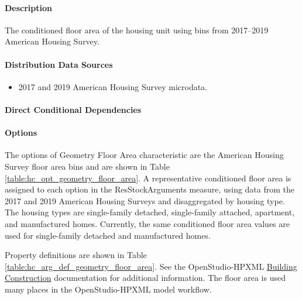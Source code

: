 \paragraph{Description}
% 
The conditioned floor area of the housing unit using bins from 2017--2019 American Housing Survey.

\paragraph{Distribution Data Sources}
% 
\begin{itemize}
    \item 2017 and 2019 American Housing Survey microdata.
\end{itemize}

\paragraph{Direct Conditional Dependencies}


\paragraph{Options}
The options of Geometry Floor Area characteristic are the American Housing Survey floor area bins and are shown in Table \ref{table:hc_opt_geometry_floor_area}. A representative conditioned floor area is assigned to each option in the ResStockArguments measure, using data from the 2017 and 2019 American Housing Surveys and disaggregated by housing type. The housing types are single-family detached, single-family attached, apartment, and manufactured homes. Currently, the same conditioned floor area values are used for single-family detached and manufactured homes.



Property definitions are shown in Table \ref{table:hc_arg_def_geometry_floor_area}. See the OpenStudio-HPXML \href{https://openstudio-hpxml.readthedocs.io/en/v1.10.0/workflow_inputs.html#hpxml-building-construction}{Building Construction} documentation for additional information. The floor area is used many places in the OpenStudio-HPXML model workflow.



